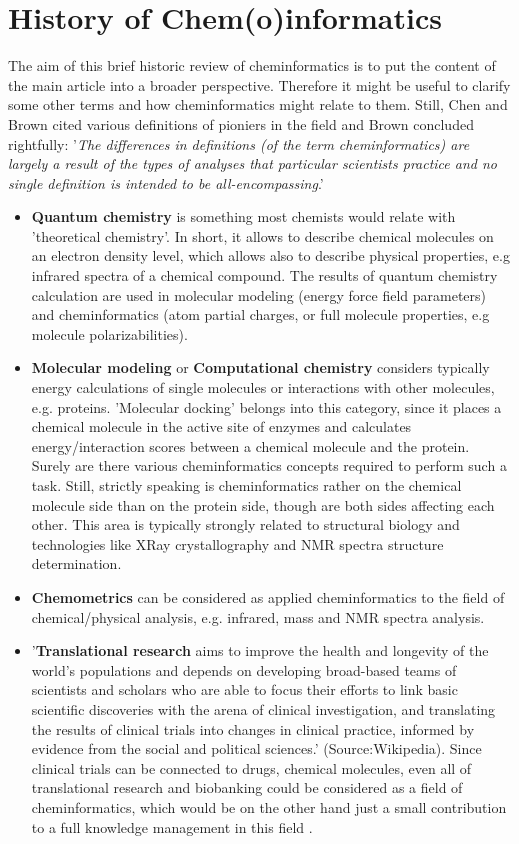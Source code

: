 \documentclass{sig-alternate}
\begin{document}
\section{History of Chem(o)informatics}
The aim of this brief historic review of cheminformatics is to put the
content of the main article into a broader perspective. Therefore it
might be useful to clarify some other terms and how cheminformatics
might relate to them.  Still, Chen \cite{Chen2006} and Brown
\cite{brown2009} cited various definitions of pioniers in the field
and Brown concluded rightfully: '\textit{The differences in
  definitions (of the term cheminformatics) are largely a result of
  the types of analyses that particular scientists practice and no
  single definition is intended to be all-encompassing}.'
\begin{itemize}
\item \textbf{Quantum chemistry} is something most chemists would
  relate with 'theoretical chemistry'. In short, it allows to describe
  chemical molecules on an electron density level, which allows also
  to describe physical properties, e.g infrared spectra of a chemical
  compound.  The results of quantum chemistry calculation are used in
  molecular modeling (energy force field parameters) and
  cheminformatics (atom partial charges, or full molecule properties,
  e.g molecule polarizabilities).
\item \textbf{Molecular modeling} or \textbf{Computational chemistry}
  considers typically energy calculations of single molecules or
  interactions with other molecules, e.g. proteins. 'Molecular
  docking' belongs into this category, since it places a chemical
  molecule in the active site of enzymes and calculates
  energy/interaction scores between a chemical molecule and the
  protein. Surely are there various cheminformatics concepts required
  to perform such a task. Still, strictly speaking is cheminformatics
  rather on the chemical molecule side than on the protein side,
  though are both sides affecting each other. This area is typically
  strongly related to structural biology and technologies like XRay
  crystallography and NMR spectra structure determination.
\item \textbf{Chemometrics} can be considered as applied
  cheminformatics to the field of chemical/physical analysis,
  e.g. infrared, mass and NMR spectra analysis.
\item '\textbf{Translational research} aims to improve the health and
  longevity of the world's populations and depends on developing
  broad-based teams of scientists and scholars who are able to focus
  their efforts to link basic scientific discoveries with the arena of
  clinical investigation, and translating the results of clinical
  trials into changes in clinical practice, informed by evidence from
  the social and political sciences.' (Source:Wikipedia).  Since
  clinical trials can be connected to drugs, chemical molecules, even
  all of translational research and biobanking could be considered as
  a field of cheminformatics, which would be on the other hand just a
  small contribution to a full knowledge management in this field
  \cite{Szalma2010}.
\end{itemize}
\end{document}
